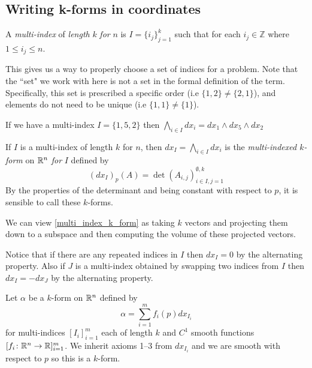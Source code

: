 \documentclass[notes]{subfiles}
\begin{document}
\subsection{Writing k-forms in coordinates}
\begin{definition}
    A \textit{multi-index} of \textit{length} $k$ \textit{for} $n$ is $I = \{i_j\}_{j = 1}^k$ such that for each $i_j \in \mathbb{Z}$ where $1 \leq i_j \leq n$.
\end{definition}
This gives us a way to properly choose a set of indices for a problem. Note that the ``set" we work with here is not a set in the formal definition of the term. Specifically, this set is prescribed a specific order (i.e $\{ 1, 2 \} \neq \{ 2, 1 \}$), and elements do not need to be unique (i.e $\{ 1, 1 \} \neq \{ 1 \}$).

\begin{example}
    If we have a multi-index $I = \{1, 5, 2\}$ then $\bigwedge_{i \in I} dx_i = dx_1 \wedge dx_5 \wedge dx_2$
\end{example}

\begin{definition} \label{multi_index_k_form}
    If $I$ is a multi-index of length $k$ for $n$, then $dx_I = \bigwedge_{i \in I} dx_i$ is the \textit{multi-indexed $k$-form} on $\mathbb{R}^n$ \textit{for} $I$ defined by
    \[
        (dx_I)_p(A)
        = \det(A_{i, j})_{i \in I, j = 1}^{\emptyset, k}
    \]
    By the properties of the determinant and being constant with respect to $p$, it is sensible to call these $k$-forms.
\end{definition}

We can view \cref{multi_index_k_form} as taking $k$ vectors and projecting them down to a subspace and then computing the volume of these projected vectors.

Notice that if there are any repeated indices in $I$ then $dx_I = 0$ by the alternating property. Also if $J$ is a multi-index obtained by swapping two indices from $I$ then $dx_I = -dx_J$ by the alternating property.

\begin{example}
    Let $\alpha$ be a $k$-form on $\mathbb{R}^n$ defined by
    \[
        \alpha = \sum_{i = 1}^m f_i(p) dx_{I_i}
    \]
    for multi-indices $[I_i]_{i = 1}^m$ each of length $k$ and $C^1$ smooth functions $[f_i\colon \mathbb{R}^n \to \mathbb{R}]_{i = 1}^m$. We inherit axioms 1--3 from $dx_{I_i}$ and we are smooth with respect to $p$ so this is a $k$-form.
\end{example}
\end{document}
